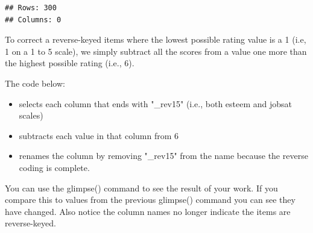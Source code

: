 \documentclass[
]{krantz}
\makeatletter
\newenvironment{Shaded}{\begin{snugshade}}{\end{snugshade}}
\newcommand{\DataTypeTok}[1]{\textcolor[rgb]{0.27,0.27,0.27}{#1}}
\newcommand{\DecValTok}[1]{\textcolor[rgb]{0.06,0.06,0.06}{#1}}
\newcommand{\KeywordTok}[1]{\textcolor[rgb]{0.27,0.27,0.27}{\textbf{#1}}}
\newcommand{\NormalTok}[1]{#1}
\newcommand{\OperatorTok}[1]{\textcolor[rgb]{0.43,0.43,0.43}{\textbf{#1}}}
\newcommand{\StringTok}[1]{\textcolor[rgb]{0.5,0.5,0.5}{#1}}
\providecommand{\tightlist}{%
  \setlength{\itemsep}{0pt}\setlength{\parskip}{0pt}}
\newenvironment{kframe}{%
\medskip{}
\setlength{\fboxsep}{.8em}
 \def\at@end@of@kframe{}%
 \ifinner\ifhmode%
  \def\at@end@of@kframe{\end{minipage}}%
  \begin{minipage}{\columnwidth}%
 \fi\fi%
 \def\FrameCommand##1{\hskip\@totalleftmargin \hskip-\fboxsep
 \colorbox{shadecolor}{##1}\hskip-\fboxsep
     \hskip-\linewidth \hskip-\@totalleftmargin \hskip\columnwidth}%
 \MakeFramed {\advance\hsize-\width
   \@totalleftmargin\z@ \linewidth\hsize
   \@setminipage}}%
 {\par\unskip\endMakeFramed%
 \at@end@of@kframe}
\renewenvironment{Shaded}{\begin{kframe}}{\end{kframe}}
\makeatother
\begin{document}
\begin{Shaded}
\end{Shaded}

\begin{verbatim}
## Rows: 300
## Columns: 0
\end{verbatim}

To correct a reverse-keyed items where the lowest possible rating value is a 1 (i.e, 1 on a 1 to 5 scale), we simply subtract all the scores from a value one more than the highest possible rating (i.e., 6).

The code below:

\begin{itemize}
\tightlist
\item
  selects each column that ends with "\_rev15" (i.e., both esteem and jobsat scales)
\item
  subtracts each value in that column from 6
\item
  renames the column by removing "\_rev15" from the name because the reverse coding is complete.
\end{itemize}

\begin{Shaded}
\end{Shaded}

You can use the glimpse() command to see the result of your work. If you compare this to values from the previous glimpse() command you can see they have changed. Also notice the column names no longer indicate the items are reverse-keyed.
\end{document}
